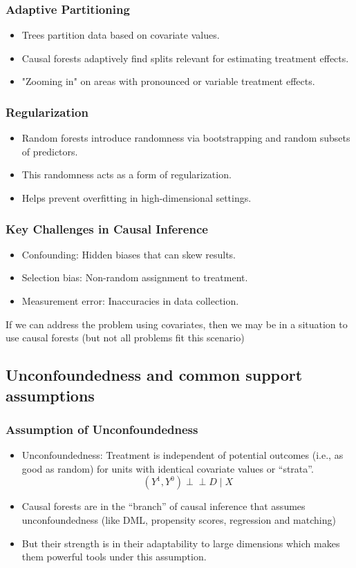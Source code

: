 \documentclass{beamer}
\begin{document}
\begin{frame}
\frametitle{Adaptive Partitioning}
\begin{itemize}
    \item Trees partition data based on covariate values.
    \item Causal forests adaptively find splits relevant for estimating treatment effects.
    \item "Zooming in" on areas with pronounced or variable treatment effects.
\end{itemize}
\end{frame}

\begin{frame}
\frametitle{Regularization}
\begin{itemize}
    \item Random forests introduce randomness via bootstrapping and random subsets of predictors.
    \item This randomness acts as a form of regularization.
    \item Helps prevent overfitting in high-dimensional settings.
\end{itemize}
\end{frame}

\begin{frame}
\frametitle{Key Challenges in Causal Inference}
\begin{itemize}
    \item Confounding: Hidden biases that can skew results.
    \item Selection bias: Non-random assignment to treatment.
    \item Measurement error: Inaccuracies in data collection.
\end{itemize}

\bigskip

If we can address the problem using covariates, then we may be in a situation to use causal forests (but not all problems fit this scenario)

\end{frame}


\subsection{Unconfoundedness and common support assumptions}

\begin{frame}
\frametitle{Assumption of Unconfoundedness}
\begin{itemize}
    \item Unconfoundedness: Treatment is independent of potential outcomes (i.e., as good as random) for units with identical covariate values or ``strata''.$$(Y^1, Y^0) \perp\!\!\!\perp D \mid X$$

    \item Causal forests are in the ``branch'' of causal inference that assumes unconfoundedness (like DML, propensity scores, regression and matching)
    \item But their strength is in their adaptability to large dimensions which makes them powerful tools under this assumption.

\end{itemize}
\end{frame}
\end{document}

